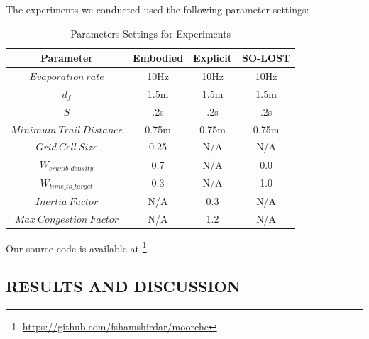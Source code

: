 \documentclass[letterpaper, 10 pt, conference]{ieeeconf}  %
\begin{document}
The experiments we conducted used the following parameter settings:

\begin{table}[ht]                                                              
  \begin{center}
    \begin{tabular}{|c|c|c|c|}                                                
    \hline
      Parameter & Embodied & Explicit & SO-LOST\\                                  
    \hline                                                                    
      $Evaporation\ rate$ & 10Hz & 10Hz & 10Hz\\ %
    \hline
      $d_f$ & 1.5m & 1.5m & 1.5m\\ %
    \hline
      $S$ & .2s & .2s & .2s\\ %
    \hline
      $Minimum\ Trail\ Distance$ & 0.75m & 0.75m & 0.75m\\ %
    \hline
      $Grid\ Cell\ Size$ & 0.25 & N/A & N/A\\ %
    \hline
      $W_{crumb\_density}$ & 0.7 & N/A & 0.0\\ %
    \hline
      $W_{time\_to\_target}$ & 0.3 & N/A & 1.0\\ %
    \hline
      $Inertia\ Factor$ & N/A & 0.3 & N/A\\ %
    \hline
      $Max\ Congestion\ Factor$ & N/A & 1.2 & N/A\\ %
    \hline
    \end{tabular}
   \caption{Parameters Settings for Experiments}                                
    \label{table:parameter_settings}
  \end{center}
\end{table}

Our source code is available at \footnote{\url{https://github.com/fshamshirdar/moorche}}.

\subsection{RESULTS AND DISCUSSION}
\end{document}
